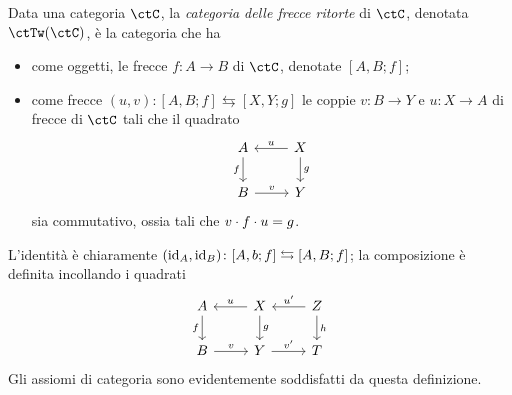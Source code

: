 \begin{definition}\label{def_cat_frecce_ritorte}
 Data una categoria \(\ctC\), la \emph{categoria delle frecce ritorte} di \(\ctC\), denotata \(\ctTw(\ctC)\), è la categoria che ha
 \begin{itemize}
  \item come oggetti, le frecce	\(f \colon A \to B\) di \(\ctC\), denotate \([A,B;f]\);
  \item come frecce \((u,v) \colon [A,B;f]\leftrightarrows [X,Y;g]\) le coppie \(v \colon B\to Y\) e \(u \colon X \to A\) di frecce di \(\ctC\) tali che il quadrato
        \[
         \begin{tikzcd}
          A \ar{d}[swap]{f} & X \ar{l}[swap]{u} \ar{d}{g} \\
          B  \ar{r}{v} & Y
         \end{tikzcd}
        \]
        sia commutativo, ossia tali che \(v\cdot f\cdot u = g\).
 \end{itemize}
 L'identità è chiaramente \((\mathrm{id}_A,\mathrm{id}_B) \colon [A,b;f] \leftrightarrows [A,B;f]\); la composizione è definita incollando i quadrati
 \[
  \begin{tikzcd}
   A \ar{d}[swap]{f} & X \ar{l}[swap]{u} \ar{d}{g} & Z \ar{d}{h}\ar{l}[swap]{u'} \\
   B  \ar{r}{v} & Y \ar{r}{v'}& T
  \end{tikzcd}
 \]
 Gli assiomi di categoria sono evidentemente soddisfatti da questa definizione.
\end{definition}
